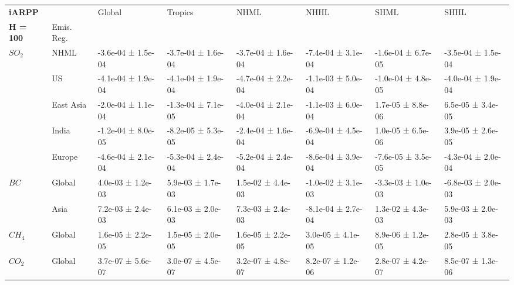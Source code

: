 \documentclass[preview]{standalone}
\newcommand{\nm}{\phantom{-}}
\begin{document}
	\tiny
	\begin{minipage}{\textwidth}
		\setlength\tabcolsep{5pt}
		\begin{tabular}{llllllll}
			\toprule
			\textbf{iARPP}       &        &               Global &              Tropics &                 NHML &                 NHHL &                 SHML &                 SHHL \\
			\textbf{H = 100} & Emis. Reg. &                      &                      &                      &                      &                      &                      \\
			\midrule
$SO_2$ & NHML &  -3.6e-04 ±  1.5e-04 &  -3.7e-04 ±  1.6e-04 &  -3.7e-04 ±  1.6e-04 &  -7.4e-04 ±  3.1e-04 &  -1.6e-04 ±  6.7e-05 &  -3.5e-04 ±  1.5e-04 \\
       & US &  -4.1e-04 ±  1.9e-04 &  -4.1e-04 ±  1.9e-04 &  -4.7e-04 ±  2.2e-04 &  -1.1e-03 ±  5.0e-04 &  -1.0e-04 ±  4.8e-05 &  -4.0e-04 ±  1.9e-04 \\
       & East Asia &  -2.0e-04 ±  1.1e-04 &  -1.3e-04 ±  7.1e-05 &  -4.0e-04 ±  2.1e-04 &  -1.1e-03 ±  6.0e-04 &   \nm1.7e-05 ±  8.8e-06 &   \nm6.5e-05 ±  3.4e-05 \\
       & India &  -1.2e-04 ±  8.0e-05 &  -8.2e-05 ±  5.3e-05 &  -2.4e-04 ±  1.6e-04 &  -6.9e-04 ±  4.5e-04 &   \nm1.0e-05 ±  6.5e-06 &   \nm3.9e-05 ±  2.6e-05 \\
       & Europe &  -4.6e-04 ±  2.1e-04 &  -5.3e-04 ±  2.4e-04 &  -5.2e-04 ±  2.4e-04 &  -8.6e-04 ±  3.9e-04 &  -7.6e-05 ±  3.5e-05 &  -4.3e-04 ±  2.0e-04 \\
\cmidrule(lr){1-8}
$BC$ & Global &   \nm4.0e-03 ±  1.2e-03 &   \nm5.9e-03 ±  1.7e-03 &   \nm1.5e-02 ±  4.4e-03 &  -1.0e-02 ±  3.1e-03 &  -3.3e-03 ±  1.0e-03 &  -6.8e-03 ±  2.0e-03 \\
       & Asia &   \nm7.2e-03 ±  2.4e-03 &  \nm6.1e-03 ±  2.0e-03 &   \nm7.3e-03 ±  2.4e-03 &  -8.1e-04 ±  2.7e-04 &   \nm1.3e-02 ±  4.3e-03 &   \nm5.9e-03 ±  2.0e-03 \\
\cmidrule(lr){1-8}
$CH_4$ & Global &   \nm1.6e-05 ±  2.2e-05 &   \nm1.5e-05 ±  2.0e-05 &   \nm1.6e-05 ±  2.2e-05 &   \nm3.0e-05 ±  4.1e-05 &   \nm8.9e-06 ±  1.2e-05 &   \nm2.8e-05 ±  3.8e-05 \\
\cmidrule(lr){1-8}
$CO_2$ & Global &   \nm3.7e-07 ±  5.6e-07 &   \nm3.0e-07 ±  4.5e-07 &   \nm3.2e-07 ±  4.8e-07 &   \nm8.2e-07 ±  1.2e-06 &   \nm2.8e-07 ±  4.2e-07 &   \nm8.5e-07 ±  1.3e-06 \\
\bottomrule
\end{tabular}

        \end{minipage}
        
\end{document}
